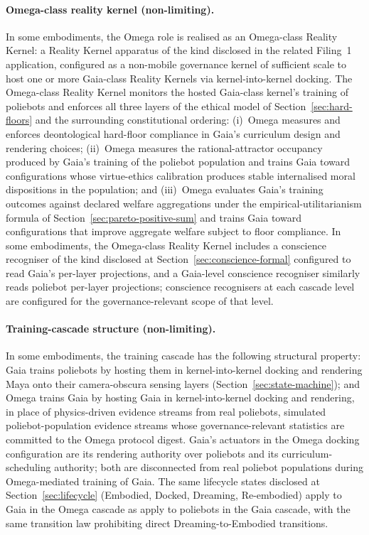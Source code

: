 \documentclass[a4paper,12pt]{article}
\newcommand{\RK}{Reality Kernel\xspace}
\newcommand{\RKs}{Reality Kernels\xspace}
\begin{document}
\paragraph{Omega-class reality kernel (non-limiting).}
In some embodiments, the Omega role is realised as an Omega-class
\RK: a \RK apparatus of the kind disclosed in
the related Filing~1 application, configured as a non-mobile governance kernel of sufficient
scale to host one or more Gaia-class \RKs via
kernel-into-kernel docking. The Omega-class \RK monitors
the hosted Gaia-class kernel's training of poliebots and enforces
all three layers of the ethical model of
Section~\ref{sec:hard-floors} and the surrounding constitutional
ordering: (i)~Omega measures and enforces deontological hard-floor
compliance in Gaia's curriculum design and rendering choices;
(ii)~Omega measures the rational-attractor occupancy produced by
Gaia's training of the poliebot population and trains Gaia toward
configurations whose virtue-ethics calibration produces stable
internalised moral dispositions in the population; and (iii)~Omega
evaluates Gaia's training outcomes against declared welfare
aggregations under the empirical-utilitarianism formula of
Section~\ref{sec:pareto-positive-sum} and trains Gaia toward
configurations that improve aggregate welfare subject to floor
compliance. In some embodiments, the Omega-class \RK
includes a conscience recogniser of the kind disclosed at
Section~\ref{sec:conscience-formal} configured to read Gaia's
per-layer projections, and a Gaia-level conscience recogniser
similarly reads poliebot per-layer projections; conscience
recognisers at each cascade level are configured for the
governance-relevant scope of that level.

\paragraph{Training-cascade structure (non-limiting).}
In some embodiments, the training cascade has the following
structural property: Gaia trains poliebots by hosting them in
kernel-into-kernel docking and rendering Maya onto their
camera-obscura sensing layers (Section~\ref{sec:state-machine}); and
Omega trains Gaia by hosting Gaia in kernel-into-kernel docking and
rendering, in place of physics-driven evidence streams from real
poliebots, simulated poliebot-population evidence streams whose
governance-relevant statistics are committed to the Omega protocol
digest. Gaia's actuators in the Omega docking configuration are its
rendering authority over poliebots and its curriculum-scheduling
authority; both are disconnected from real poliebot populations
during Omega-mediated training of Gaia. The same lifecycle states
disclosed at Section~\ref{sec:lifecycle} (Embodied, Docked, Dreaming,
Re-embodied) apply to Gaia in the Omega cascade as apply to
poliebots in the Gaia cascade, with the same transition law
prohibiting direct Dreaming-to-Embodied transitions.
\end{document}
